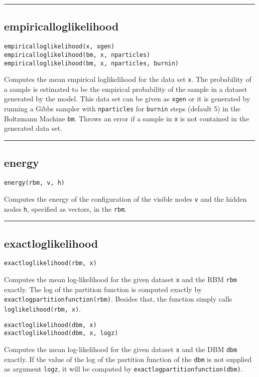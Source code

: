 \noindent\rule{\textwidth}{1pt}
\subsection*{empiricalloglikelihood}  \label{bms_empiricalloglikelihood}
\begin{verbatim}
empiricalloglikelihood(x, xgen)
empiricalloglikelihood(bm, x, nparticles)
empiricalloglikelihood(bm, x, nparticles, burnin)
\end{verbatim}
Computes the mean empirical loglikelihood for the data set \texttt{x}. The probability of a sample is estimated to be the empirical probability of the sample in a dataset generated by the model. This data set can be given as \texttt{xgen} or it is generated by running a Gibbs sampler with \texttt{nparticles} for \texttt{burnin} steps (default 5) in the Boltzmann Machine \texttt{bm}. Throws an error if a sample in \texttt{x} is not contained in the generated data set.

\noindent\rule{\textwidth}{1pt}
\subsection*{energy}  \label{bms_energy}
\begin{verbatim}
energy(rbm, v, h)
\end{verbatim}
Computes the energy of the configuration of the visible nodes \texttt{v} and the hidden nodes \texttt{h}, specified as vectors, in the \texttt{rbm}.

\noindent\rule{\textwidth}{1pt}
\subsection*{exactloglikelihood}  \label{bms_exactloglikelihood}
\begin{verbatim}
exactloglikelihood(rbm, x)
\end{verbatim}
Computes the mean log-likelihood for the given dataset \texttt{x} and the RBM \texttt{rbm} exactly. The log of the partition function is computed exactly by \texttt{exactlogpartitionfunction(rbm)}. Besides that, the function simply calls \texttt{loglikelihood(rbm, x)}.

\begin{verbatim}
exactloglikelihood(dbm, x)
exactloglikelihood(dbm, x, logz)
\end{verbatim}
Computes the mean log-likelihood for the given dataset \texttt{x} and the DBM \texttt{dbm} exactly. If the value of the log of the partition function of the \texttt{dbm} is not supplied as argument \texttt{logz}, it will be computed by \texttt{exactlogpartitionfunction(dbm)}.

